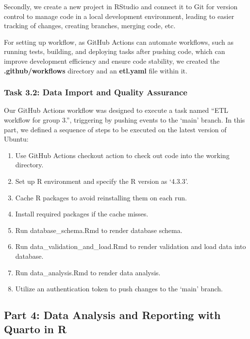 \documentclass[
  letterpaper,
  DIV=11,
  numbers=noendperiod]{scrartcl}
\providecommand{\tightlist}{%
  \setlength{\itemsep}{0pt}\setlength{\parskip}{0pt}}\usepackage{longtable,booktabs,array}
\begin{document}
Secondly, we create a new project in RStudio and connect it to Git for
version control to manage code in a local development environment,
leading to easier tracking of changes, creating branches, merging code,
etc.

For setting up workflow, as GitHub Actions can automate workflows, such
as running tests, building, and deploying tasks after pushing code,
which can improve development efficiency and ensure code stability, we
created the \textbf{.github/workflows} directory and an
\textbf{etl.yaml} file within it.

\hypertarget{task-3.2-data-import-and-quality-assurance}{%
\subsubsection{Task 3.2: Data Import and Quality
Assurance}\label{task-3.2-data-import-and-quality-assurance}}

Our GitHub Actions workflow was designed to execute a task named ``ETL
workflow for group 3.'', triggering by pushing events to the `main'
branch. In this part, we defined a sequence of steps to be executed on
the latest version of Ubuntu:

\begin{enumerate}
\def\labelenumi{\arabic{enumi}.}
\tightlist
\item
  Use GitHub Actions checkout action to check out code into the working
  directory.
\item
  Set up R environment and specify the R version as `4.3.3'.
\item
  Cache R packages to avoid reinstalling them on each run.
\item
  Install required packages if the cache misses.
\item
  Run database\_schema.Rmd to render database schema.
\item
  Run data\_validation\_and\_load.Rmd to render validation and load data
  into database.
\item
  Run data\_analysis.Rmd to render data analysis.
\item
  Utilize an authentication token to push changes to the `main' branch.
\end{enumerate}

\hypertarget{part-4-data-analysis-and-reporting-with-quarto-in-r}{%
\subsection{Part 4: Data Analysis and Reporting with Quarto in
R}\label{part-4-data-analysis-and-reporting-with-quarto-in-r}}
\end{document}
